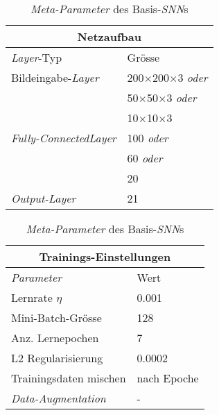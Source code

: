\begin{table}[!htb]
	\def\arraystretch{1.4}
	\centering
	\begin{subtable}[t]{.5\linewidth}
		\begin{tabular}[t]{l | l }
			\multicolumn{2}{c}{\textbf{Netzaufbau}}\\
			\hline
			\textit{Layer}-Typ & Grösse\\
			\hline
			\hline
			Bildeingabe-\textit{Layer} & 200$\times$200$\times$3 \textit{oder}\\
			& 50$\times$50$\times$3 \textit{oder}\\
			& 10$\times$10$\times$3\\
			\hline
			
			\textit{Fully-ConnectedLayer}& 100 \textit{oder}\\
			& 60 \textit{oder}\\
			& 20\\
			\hline
			\textit{Output-Layer}& 21\\
		\end{tabular}
	\end{subtable}%
	\begin{subtable}[t]{.5\linewidth}
		\begin{tabular}[t]{l | l }
			\multicolumn{2}{c}{\textbf{Trainings-Einstellungen}}\\
			\hline
			\textit{Parameter} & Wert\\
			\hline
			\hline
			Lernrate $\eta$ & 0.001\\
			Mini-Batch-Grösse & 128\\
			Anz. Lernepochen & 7\\
			L2 Regularisierung & 0.0002\\
			Trainingsdaten mischen& nach Epoche\\
			\textit{Data-Augmentation}& - \\
		\end{tabular}
	\end{subtable} 
	\caption{\textit{Meta-Parameter} des Basis-\textit{SNN}s}
	\label{table:basic_snn_training}
\end{table}

